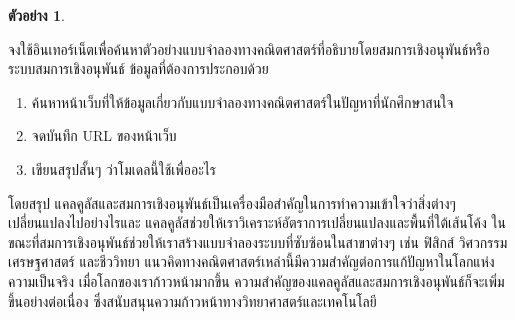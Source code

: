 \documentclass[landscape, 20pt]{extarticle}
\theoremstyle{definition}
\newtheorem{example}{ตัวอย่าง}[section]
\theoremstyle{remark}
\begin{document}
\begin{example}
\protect\hypertarget{exm:exm4}{}\label{exm:exm4}

จงใช้อินเทอร์เน็ตเพื่อค้นหาตัวอย่างแบบจำลองทางคณิตศาสตร์ที่อธิบายโดยสมการเชิงอนุพันธ์หรือระบบสมการเชิงอนุพันธ์ ข้อมูลที่ต้องการประกอบด้วย

\begin{enumerate}
\def\labelenumi{\arabic{enumi}.}
\item
  ค้นหาหน้าเว็บที่ให้ข้อมูลเกี่ยวกับแบบจำลองทางคณิตศาสตร์ในปัญหาที่นักศึกษาสนใจ
\item
  จดบันทึก URL ของหน้าเว็บ
\item
  เขียนสรุปสั้นๆ ว่าโมเดลนี้ใช้เพื่ออะไร
\end{enumerate}

\end{example}

โดยสรุป แคลคูลัสและสมการเชิงอนุพันธ์เป็นเครื่องมือสำคัญในการทำความเข้าใจว่าสิ่งต่างๆ เปลี่ยนแปลงไปอย่างไรและ แคลคูลัสช่วยให้เราวิเคราะห์อัตราการเปลี่ยนแปลงและพื้นที่ใต้เส้นโค้ง ในขณะที่สมการเชิงอนุพันธ์ช่วยให้เราสร้างแบบจำลองระบบที่ซับซ้อนในสาขาต่างๆ เช่น ฟิสิกส์ วิศวกรรม เศรษฐศาสตร์ และชีววิทยา แนวคิดทางคณิตศาสตร์เหล่านี้มีความสำคัญต่อการแก้ปัญหาในโลกแห่งความเป็นจริง เมื่อโลกของเราก้าวหน้ามากขึ้น ความสำคัญของแคลคูลัสและสมการเชิงอนุพันธ์ก็จะเพิ่มขึ้นอย่างต่อเนื่อง ซึ่งสนับสนุนความก้าวหน้าทางวิทยาศาสตร์และเทคโนโลยี
\end{document}
